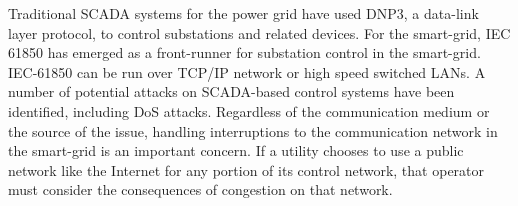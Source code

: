 Traditional \ac{SCADA} systems for the power grid have used \ac{DNP3}, a data-link layer protocol, to control substations and related devices\cite{dnp3}.
For the smart-grid, IEC 61850 has emerged as a front-runner for substation control in the smart-grid\cite{iec61850-1}\cite{iec61850-2}\cite{iec61850-3}.
IEC-61850 can be run over TCP/IP network or high speed switched LANs\cite{iec61850-3}.
A number of potential attacks on \ac{SCADA}-based control systems have been identified\cite{smartgrid-security}\cite{smartgrid-attacks}, including \ac{DoS} attacks\cite{scada-attack-dos}\cite{dnp3-attack}.
Regardless of the communication medium or the source of the issue, handling interruptions to the communication network in the smart-grid is an important concern.
If a utility chooses to use a public network like the Internet for any portion of its control network, that operator must consider the consequences of congestion on that network\cite{intelligent-control}\cite{plc-communication}\cite{wireless-congestion}.

